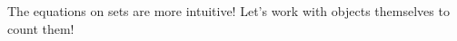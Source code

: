 \documentclass{article}
\begin{document}
The equations on sets are more intuitive! 
Let's work with objects themselves to count them! 














\end{document}
